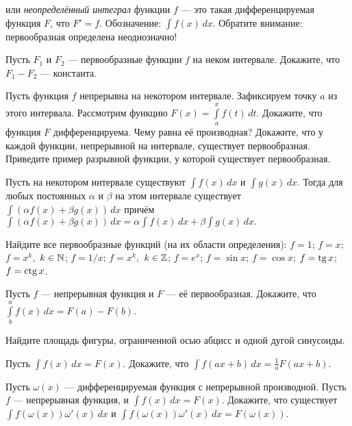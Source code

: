 \documentclass[a4paper, 11pt]{article}
\newcommand{\0}[1]{\overline{#1}}
\begin{document}



 или {\em неопределённый интеграл} функции $f$ --- это такая дифференцируемая функция $F$, что $F'=f$.
Обозначение: $\int f(x)\, dx$. Обратите внимание: первообразная определена неоднозначно!


Пусть $F_1$ и $F_2$ --- первообразные функции $f$ на неком интервале. Докажите, что %
$F_1-F_2$ --- константа.


 Пусть функция $f$ непрерывна на некотором интервале. Зафиксируем точку
$a$ из этого интервала. Рассмотрим функцию $F(x)=\int\limits_a^xf(t)\, dt$.
Докажите, что функция $F$ дифференцируема. Чему равна е\"е производная?
 Докажите, что у каждой функции, непрерывной на интервале, существует первообразная.
 Приведите пример разрывной функции, у которой существует первообразная.

Пусть на некотором интервале существуют  $\int f(x)\, dx$
и $\int g(x)\, dx$. Тогда для любых постоянных $\alpha$ и $\beta$
на этом интервале существует
 $\int (\alpha f(x)+\beta g(x))\, dx$ причём
$\int (\alpha f(x)+\beta g(x))\, dx=\alpha \int f(x)\, dx +\beta \int g(x)\, dx.$

 Найдите все первообразные функций (на их области определения):
 $f=1$;
 $f=x$;
 $f=x^k,$ $k\in \mathbb{N}$;
 $f=1/x$;
 $f=x^k,$ $k\in \mathbb{Z}$;
 $f=e^x$;
 $f=\sin x $;
 $f=\cos x $;
 $f=\tg x $;
 $f=\ctg x $.

Пусть $f$ --- непрерывная функция и $F$ --- е\"е первообразная. Докажите,
что $\int\limits_b^af(x)\, dx=F(a)-F(b)$.

Найдите площадь фигуры, ограниченной осью абцисс и одной дугой синусоиды.


Пусть $\int f(x)\, dx=F(x)$.
Докажите, что $\int f(ax+b)\, dx =\frac{1}{a}F(ax+b)$.

Пусть $\omega (x)$ --- дифференцируемая функция с непрерывной производной.
Пусть $f$ --- непрерывная функция, и $\int f(x)\, dx=F(x)$.
Докажите, что существует $\int f(\omega (x))\omega '(x)\, dx$ и
$\int f(\omega (x))\omega '(x)\, dx=F(\omega (x)).$
\end{document}
